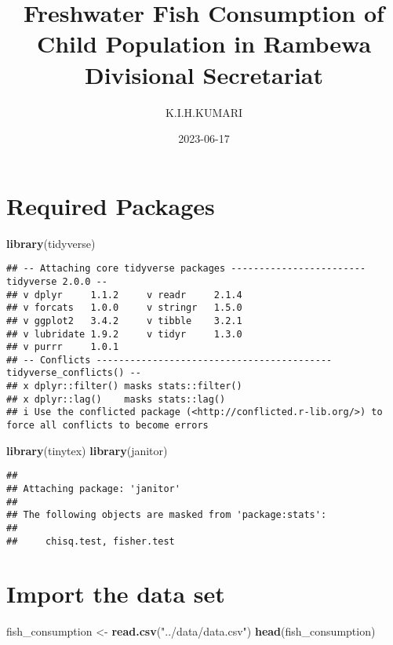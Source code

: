 \documentclass[
]{article}
\title{Freshwater Fish Consumption of Child Population in Rambewa
Divisional Secretariat}
\author{K.I.H.KUMARI}
\date{2023-06-17}
\newenvironment{Shaded}{\begin{snugshade}}{\end{snugshade}}
\newcommand{\FunctionTok}[1]{\textcolor[rgb]{0.13,0.29,0.53}{\textbf{#1}}}
\newcommand{\NormalTok}[1]{#1}
\newcommand{\OtherTok}[1]{\textcolor[rgb]{0.56,0.35,0.01}{#1}}
\newcommand{\StringTok}[1]{\textcolor[rgb]{0.31,0.60,0.02}{#1}}
\begin{document}
\maketitle

\hypertarget{required-packages}{%
\section{Required Packages}\label{required-packages}}

\begin{Shaded}
\begin{Highlighting}[]
\FunctionTok{library}\NormalTok{(tidyverse)}
\end{Highlighting}
\end{Shaded}

\begin{verbatim}
## -- Attaching core tidyverse packages ------------------------ tidyverse 2.0.0 --
## v dplyr     1.1.2     v readr     2.1.4
## v forcats   1.0.0     v stringr   1.5.0
## v ggplot2   3.4.2     v tibble    3.2.1
## v lubridate 1.9.2     v tidyr     1.3.0
## v purrr     1.0.1     
## -- Conflicts ------------------------------------------ tidyverse_conflicts() --
## x dplyr::filter() masks stats::filter()
## x dplyr::lag()    masks stats::lag()
## i Use the conflicted package (<http://conflicted.r-lib.org/>) to force all conflicts to become errors
\end{verbatim}

\begin{Shaded}
\begin{Highlighting}[]
\FunctionTok{library}\NormalTok{(tinytex)}
\FunctionTok{library}\NormalTok{(janitor)}
\end{Highlighting}
\end{Shaded}

\begin{verbatim}
## 
## Attaching package: 'janitor'
## 
## The following objects are masked from 'package:stats':
## 
##     chisq.test, fisher.test
\end{verbatim}

\hypertarget{import-the-data-set}{%
\section{Import the data set}\label{import-the-data-set}}

\begin{Shaded}
\begin{Highlighting}[]
\NormalTok{fish\_consumption }\OtherTok{\textless{}{-}} \FunctionTok{read.csv}\NormalTok{(}\StringTok{"../data/data.csv"}\NormalTok{)}
\FunctionTok{head}\NormalTok{(fish\_consumption)}
\end{Highlighting}
\end{Shaded}
\end{document}

